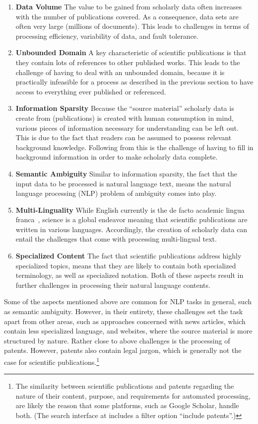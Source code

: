 \begin{enumerate}
    \item \textbf{Data Volume} The value to be gained from scholarly data often increases with the number of publications covered. As a consequence, data sets are often very large (millions of documents). This leads to challenges in terms of processing efficiency, variability of data, and fault tolerance.
    \item \textbf{Unbounded Domain} A key characteristic of scientific publications is that they contain lots of references to other published works. This leads to the challenge of having to deal with an unbounded domain, because it is practically infeasible for a process as described in the previous section to have access to everything ever published or referenced.
    \item \textbf{Information Sparsity} Because the ``source material'' scholarly data is create from (publications) is created with human consumption in mind, various pieces of information necessary for understanding can be left out. This is due to the fact that readers can be assumed to possess relevant background knowledge. Following from this is the challenge of having to fill in background information in order to make scholarly data complete.
    \item \textbf{Semantic Ambiguity} Similar to information sparsity, the fact that the input data to be processed is natural language text, means the natural language processing (NLP) problem of ambiguity comes into play.
    \item \textbf{Multi-Linguality} While English currently is the de facto academic lingua franca~\cite{Montgomery2013}, science is a global endeavor meaning that scientific publications are written in various languages. Accordingly, the creation of scholarly data can entail the challenges that come with processing multi-lingual text.
    \item \textbf{Specialized Content} The fact that scientific publications address highly specialized topics, means that they are likely to contain both specialized terminology, as well as specialized notation. Both of these aspects result in further challenges in processing their natural language contents.
\end{enumerate}

Some of the aspects mentioned above are common for NLP tasks in general, such as semantic ambiguity. However, in their entirety, these challenges set the task apart from other areas, such as approaches concerned with news articles, which contain less specialized language, and websites, where the source material is more structured by nature. Rather close to above challenges is the processing of patents. However, patents also contain legal jargon, which is generally not the case for scientific publications.\footnote{The similarity between scientific publications and patents regarding the nature of their content, purpose, and requirements for automated processing, are likely the reason that some platforms, such as Google Scholar, handle both. (The search interface at  includes a filter option ``include patents''.)}


